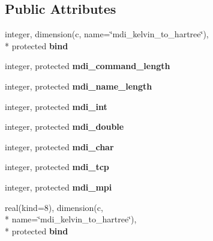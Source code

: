 \subsection*{Public Attributes}
\begin{DoxyCompactItemize}
\item 
\hypertarget{classmdi_accae5b01e087f8738d86006e68417f6d}{integer, dimension(c, name=\char`\"{}mdi\-\_\-kelvin\-\_\-to\-\_\-hartree\char`\"{}), \\*
protected {\bfseries bind}}\label{classmdi_accae5b01e087f8738d86006e68417f6d}

\item 
\hypertarget{classmdi_a476a171077b89b7bc1e0153edaee118a}{integer, protected {\bfseries mdi\-\_\-command\-\_\-length}}\label{classmdi_a476a171077b89b7bc1e0153edaee118a}

\item 
\hypertarget{classmdi_a8038fa45863d082fafb692e8bc1f4b5a}{integer, protected {\bfseries mdi\-\_\-name\-\_\-length}}\label{classmdi_a8038fa45863d082fafb692e8bc1f4b5a}

\item 
\hypertarget{classmdi_ae85ef43174229bd688543ad4bcc08a2b}{integer, protected {\bfseries mdi\-\_\-int}}\label{classmdi_ae85ef43174229bd688543ad4bcc08a2b}

\item 
\hypertarget{classmdi_a69ba399f9ad46c8ac033b26574c9b6ef}{integer, protected {\bfseries mdi\-\_\-double}}\label{classmdi_a69ba399f9ad46c8ac033b26574c9b6ef}

\item 
\hypertarget{classmdi_a5741adbde5b79f06a9b94b17c7f16eb7}{integer, protected {\bfseries mdi\-\_\-char}}\label{classmdi_a5741adbde5b79f06a9b94b17c7f16eb7}

\item 
\hypertarget{classmdi_a1605c457efb88fc7e1f169734c58b52c}{integer, protected {\bfseries mdi\-\_\-tcp}}\label{classmdi_a1605c457efb88fc7e1f169734c58b52c}

\item 
\hypertarget{classmdi_a4039d7ab89098798e98dda20ece81eaf}{integer, protected {\bfseries mdi\-\_\-mpi}}\label{classmdi_a4039d7ab89098798e98dda20ece81eaf}

\item 
\hypertarget{classmdi_aff013df9c91a218d860486ff0fc757e4}{real(kind=8), dimension(c, \\*
name=\char`\"{}mdi\-\_\-kelvin\-\_\-to\-\_\-hartree\char`\"{}), \\*
protected {\bfseries bind}}\label{classmdi_aff013df9c91a218d860486ff0fc757e4}


\end{DoxyCompactItemize}
